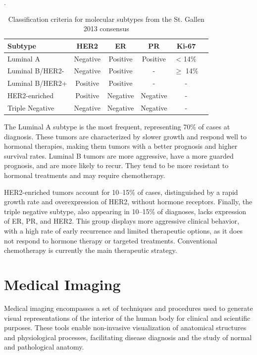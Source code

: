 \documentclass[a4paper,10pt]{book}
\begin{document}
\begin{table}[h!]
	\centering
        \caption{Classification criteria for molecular subtypes from the St. Gallen 2013 consensus \cite{goldhirsch_personalizing_2013}}.
	\begin{tabular}{lccccc}
		\toprule
		\textbf{Subtype} & \textbf{HER2} & \textbf{ER} & \textbf{PR} & \textbf{Ki-67} \\
		\midrule
		Luminal A        & Negative      & Positive    & Positive    & < 14\%         \\
		Luminal B/HER2-  & Negative      & Positive    & -           & $\geq$ 14\%    \\
		Luminal B/HER2+  & Positive      & Positive    & -           & -              \\
		HER2-enriched    & Positive      & Negative    & Negative    & -              \\
		Triple Negative  & Negative      & Negative    & Negative    & -              \\
		\bottomrule
	\end{tabular}
	\label{tab:molecular_subtypes_comb}
\end{table}

The Luminal A subtype is the most frequent, representing 70\% of cases at diagnosis. These tumors are characterized by slower growth and respond well to hormonal therapies, making them tumors with a better prognosis and higher survival rates. Luminal B tumors are more aggressive, have a more guarded prognosis, and are more likely to recur. They tend to be more resistant to hormonal treatments and may require chemotherapy.

HER2-enriched tumors account for 10–15\% of cases, distinguished by a rapid growth rate and overexpression of HER2, without hormone receptors. Finally, the triple negative subtype, also appearing in 10–15\% of diagnoses, lacks expression of ER, PR, and HER2. This group displays more aggressive clinical behavior, with a high rate of early recurrence and limited therapeutic options, as it does not respond to hormone therapy or targeted treatments. Conventional chemotherapy is currently the main therapeutic strategy.

\section{Medical Imaging}

Medical imaging encompasses a set of techniques and procedures used to generate visual representations of the interior of the human body for clinical and scientific purposes. These tools enable non-invasive visualization of anatomical structures and physiological processes, facilitating disease diagnosis and the study of normal and pathological anatomy.
\end{document}
